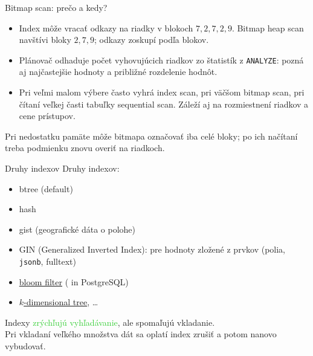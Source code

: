 \documentclass[12pt]{beamer}
\def\green#1{\textcolor{LimeGreen}{#1}}
\begin{document}
\begin{frame}[fragile]{Bitmap scan: prečo a kedy?}
\begin{itemize}
\item Index môže vracať odkazy na riadky v blokoch $7,2,7,2,9$.
Bitmap heap scan navštívi bloky $2,7,9$; odkazy zoskupí podľa blokov.
\item Plánovač odhaduje počet vyhovujúcich riadkov zo štatistík z \verb|ANALYZE|:
pozná aj najčastejšie hodnoty a približné rozdelenie hodnôt.
\item Pri veľmi malom výbere často vyhrá index scan, pri väčšom bitmap scan,
pri čítaní veľkej časti tabuľky sequential scan.
Záleží aj na rozmiestnení riadkov a cene prístupov.
\end{itemize}
{\small Pri nedostatku pamäte môže bitmapa označovať iba celé bloky;
po ich načítaní treba podmienku znovu overiť na riadkoch.}
\end{frame}

\begin{frame}[fragile]{Druhy indexov}
Druhy indexov:
\begin{itemize}
  \item btree (default)
  \item hash
  \item gist (geografické dáta o polohe)
  \item GIN (Generalized Inverted Index): pre hodnoty zložené z prvkov (polia, \verb|jsonb|, fulltext)
  \item \href{https://brilliant.org/wiki/bloom-filter/#:~:text=A%20bloom%20filter%20is%20a,is%20added%20to%20the%20set.}{bloom filter} (\uv{user-installed} in PostgreSQL)
  \item \href{https://en.wikipedia.org/wiki/K-d_tree}{$k$-dimensional tree}, \dots
\end{itemize}
\bigskip

Indexy \green{zrýchľujú vyhľadávanie}, ale \alert{spomaľujú vkladanie}.\\
Pri vkladaní veľkého množstva dát sa oplatí index zrušiť a potom nanovo vybudovať.
\end{frame}
\end{document}
